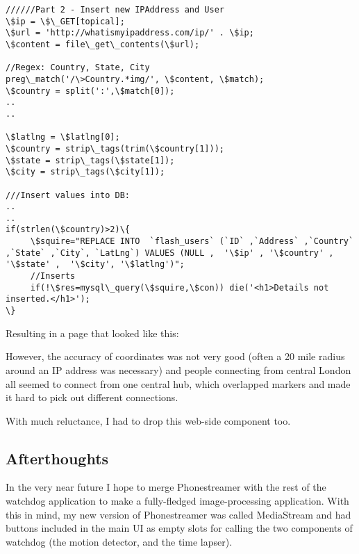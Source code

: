 \begin{lstlisting}[title=\bf Snippet from insert.php]
//////Part 2 - Insert new IPAddress and User
\$ip = \$\_GET[topical];
\$url = 'http://whatismyipaddress.com/ip/' . \$ip;
\$content = file\_get\_contents(\$url);

//Regex: Country, State, City
preg\_match('/\>Country.*img/', \$content, \$match); 
\$country = split(':',\$match[0]);
..
..

\$latlng = \$latlng[0];
\$country = strip\_tags(trim(\$country[1]));
\$state = strip\_tags(\$state[1]);
\$city = strip\_tags(\$city[1]);

///Insert values into DB:
..
..
if(strlen(\$country)>2)\{
     \$squire="REPLACE INTO  `flash_users` (`ID` ,`Address` ,`Country` ,`State` ,`City`, `LatLng`) VALUES (NULL ,  '\$ip' , '\$country' , '\$state' ,  '\$city', '\$latlng')";
     //Inserts
     if(!\$res=mysql\_query(\$squire,\$con)) die('<h1>Details not inserted.</h1>');
\}
\end{lstlisting}

Resulting in a page that looked like this:

However, the accuracy of coordinates was not very good (often a 20 mile radius around an IP address was necessary) and people connecting from central London all seemed to connect from one central hub, which overlapped markers and made it hard to pick out different connections.

With much reluctance, I had to drop this web-side component too.

\subsection{Afterthoughts}
In the very near future I hope to merge Phonestreamer with the rest of the watchdog application to make a fully-fledged image-processing application. With this in mind, my new version of Phonestreamer was called MediaStream and had buttons included in the main UI as empty slots for calling the two components of watchdog (the motion detector, and the time lapser).
%
%
